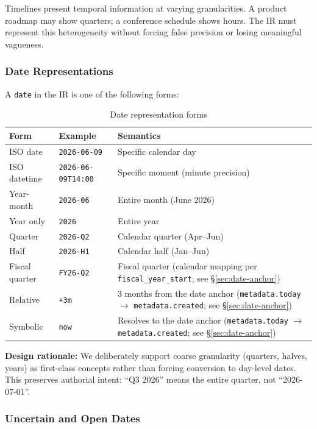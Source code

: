 Timelines present temporal information at varying granularities. A product roadmap may show
quarters; a conference schedule shows hours. The IR must represent this heterogeneity without
forcing false precision or losing meaningful vagueness.

\subsubsection{Date Representations}

A \texttt{date} in the IR is one of the following forms:

\begin{table}[h]
\centering
\small
\begin{tabular}{llp{6cm}}
\toprule
\textbf{Form} & \textbf{Example} & \textbf{Semantics} \\
\midrule
ISO date & \texttt{2026-06-09} & Specific calendar day \\
ISO datetime & \texttt{2026-06-09T14:00} & Specific moment (minute precision) \\
Year-month & \texttt{2026-06} & Entire month (June 2026) \\
Year only & \texttt{2026} & Entire year \\
Quarter & \texttt{2026-Q2} & Calendar quarter (Apr--Jun) \\
Half & \texttt{2026-H1} & Calendar half (Jan--Jun) \\
Fiscal quarter & \texttt{FY26-Q2} & Fiscal quarter (calendar mapping per \texttt{fiscal\_year\_start}; see \S\ref{sec:date-anchor}) \\
Relative & \texttt{+3m} & 3 months from the date anchor (\texttt{metadata.today} $\to$ \texttt{metadata.created}; see \S\ref{sec:date-anchor}) \\
Symbolic & \texttt{now} & Resolves to the date anchor (\texttt{metadata.today} $\to$ \texttt{metadata.created}; see \S\ref{sec:date-anchor}) \\
\bottomrule
\end{tabular}
\caption{Date representation forms}
\label{tab:date-forms}
\end{table}

\textbf{Design rationale:} We deliberately support coarse granularity (quarters, halves, years)
as first-class concepts rather than forcing conversion to day-level dates. This preserves
authorial intent: ``Q3 2026'' means the entire quarter, not ``2026-07-01''.

\subsubsection{Uncertain and Open Dates}

